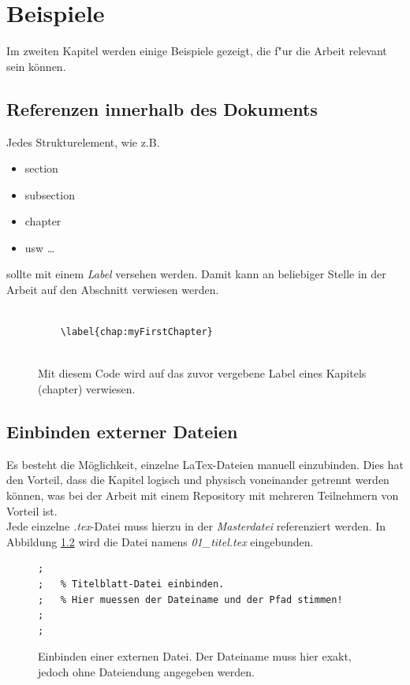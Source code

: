 \chapter{Beispiele}
\label{chap:Beispiele}
Im zweiten Kapitel werden einige Beispiele gezeigt, die f"ur die Arbeit relevant sein können.

\section{Referenzen innerhalb des Dokuments}
Jedes Strukturelement, wie z.B.
\begin{itemize}
\item section
\item subsection
\item chapter
\item usw \dots
\end{itemize}
sollte mit einem \textit{Label} versehen werden. Damit kann an beliebiger Stelle in der Arbeit auf den Abschnitt verwiesen werden.

\FloatBarrier
\begin{figure}[htb]
\begin{lstlisting}[backgroundcolor={\color{white}},
basicstyle={\normalsize\sffamily}]	

	\label{chap:myFirstChapter}
            
\end{lstlisting}
  \caption[Referenzieren auf ein Kapitel (chapter)]{Mit diesem Code wird auf das zuvor vergebene Label eines Kapitels (chapter) verwiesen.}
\label{lst:literaturenquelle}
\end{figure}



\section{Einbinden externer Dateien}
Es besteht die Möglichkeit, einzelne LaTex-Dateien manuell einzubinden. Dies hat den Vorteil, dass die Kapitel logisch und physisch voneinander getrennt werden können, was bei der Arbeit mit einem Repository mit mehreren Teilnehmern von Vorteil ist.\\

Jede einzelne \textit{.tex}-Datei muss hierzu in der \textit{Masterdatei} referenziert werden. In Abbildung \ref{lst:extDateieinbinden} wird die Datei namens \textit{01\_titel.tex} eingebunden.

\FloatBarrier
\begin{figure}[htb]
\begin{lstlisting}
;
;	% Titelblatt-Datei einbinden. 
;	% Hier muessen der Dateiname und der Pfad stimmen!
;	
;           
\end{lstlisting}
  \caption[Einbinden einer externen Datei]{Einbinden einer externen Datei. Der Dateiname muss hier exakt, jedoch ohne Dateiendung angegeben werden.}
\label{lst:extDateieinbinden}
\end{figure}


